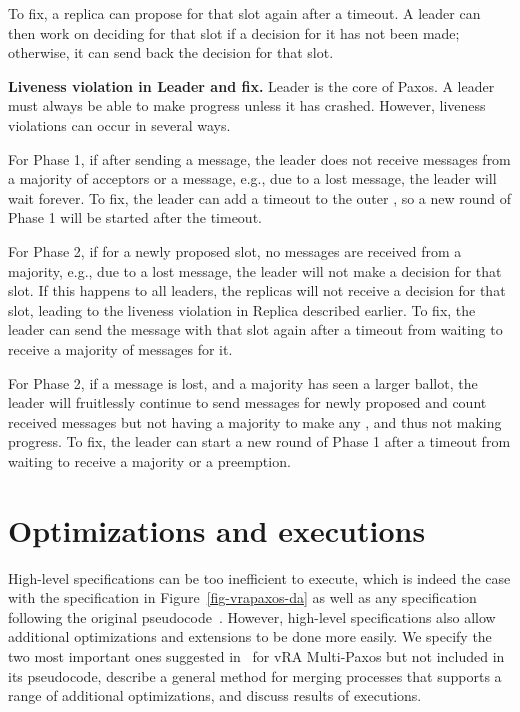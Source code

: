 \documentclass[11pt]{article}
\newcommand{\mysec}[1]{\section{#1}}
\begin{document}
\begin{description}
To fix, a replica can propose for that slot again after a timeout.  A
leader can then work on deciding for that slot if a decision for it has not
been made; otherwise, it can send back the decision for that slot.

\item {\bf Liveness violation in Leader and fix.}
Leader is the core of Paxos.  
A leader must always be able to make progress unless it has crashed.
However, liveness violations can occur in several ways.

For Phase 1, if after sending a  message, the leader does not
receive  messages from a majority of acceptors or a 
message, e.g., due to a lost  message, the leader will wait forever.
To fix, the leader can add a timeout to the outer , so a new
round of Phase 1 will be started after the timeout.

For Phase 2, if for a newly proposed slot, no  messages are received
from a majority, e.g., due to a lost  message, the leader will not
make a decision for that slot.  If this happens to all leaders, the
replicas will not receive a decision for that slot, leading to the liveness
violation in Replica described earlier.
To fix, the leader can send the  message with that slot again after
a timeout from waiting to receive a majority of  messages for it.

For Phase 2, if a  message is lost, and a majority has seen a
larger ballot, the leader will fruitlessly continue to send 
messages for newly proposed  and count received  messages 
but not having a majority to make any , and thus not making
progress.
To fix, the leader can start a new round of Phase 1 after a timeout from
waiting to receive a majority or a preemption.

\end{description}
\icdcs{}%


\mysec{%
Optimizations and executions}
\label{sec-optimize}

High-level specifications can be too inefficient to execute, which is
indeed the case with the specification in Figure~\ref{fig-vrapaxos-da} as
well as any specification following the original
pseudocode~\cite{vra15paxos}.
However, high-level specifications also allow additional optimizations and
extensions to be done more easily.  We specify the two most important ones
suggested in~\cite{vra15paxos} for vRA Multi-Paxos but not included in its
pseudocode, describe a general method for merging processes that supports a
range of additional optimizations, and discuss results of executions.
\end{document}
